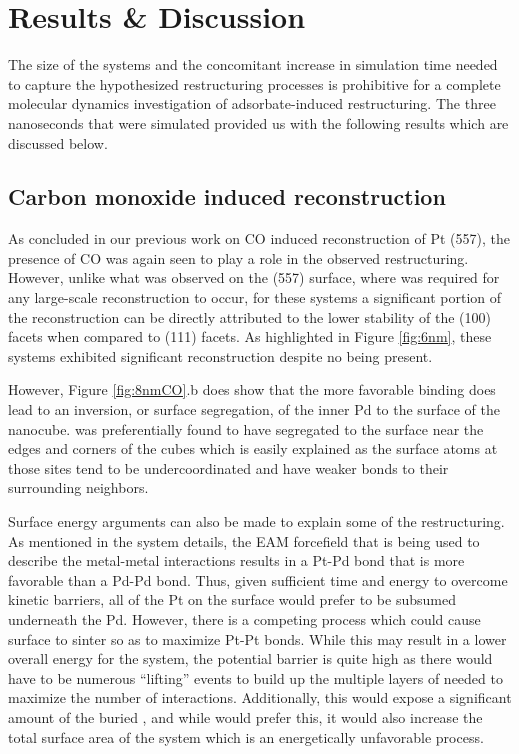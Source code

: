 \section{Results \& Discussion}
The size of the systems and the concomitant increase in simulation time needed
to capture the hypothesized restructuring processes is prohibitive for a
complete molecular dynamics investigation of adsorbate-induced restructuring.
The three nanoseconds that were simulated provided us with the following results
which are discussed below.


\subsection{Carbon monoxide induced reconstruction}
As concluded in our previous work on CO induced reconstruction of Pt (557)\citep{Michalka:2013aa}, the presence of CO
was again seen to play a role in the observed restructuring. However, unlike
what was observed on the  (557) surface, where  was required for
any large-scale reconstruction to occur, for these systems a significant
portion of the reconstruction can be directly attributed to the lower
stability of the (100) facets when compared to (111) facets. As highlighted in
Figure \ref{fig:6nm}, these systems exhibited significant reconstruction
despite no  being present. 

However, Figure \ref{fig:8nmCO}.b does show that the more favorable
 binding does lead to an inversion, or surface segregation, of
the inner Pd to the surface of the nanocube.  was preferentially found
to have segregated to the surface near the edges and corners of the cubes which
is easily explained as the surface atoms at those sites tend to be
undercoordinated and have weaker bonds to their surrounding neighbors.

Surface energy arguments can also be made to explain some of the restructuring.
As mentioned in the system details, the EAM forcefield that is being used to
describe the metal-metal interactions results in a Pt-Pd bond that is more
favorable than a Pd-Pd bond.  Thus, given sufficient time and energy to
overcome kinetic barriers, all of the Pt on the surface would prefer to be
subsumed underneath the Pd. However, there is a competing process which could
cause surface  to sinter so as to maximize Pt-Pt bonds. While this may
result in a lower overall energy for the system, the potential barrier is quite
high as there would have to be numerous ``lifting'' events to build up the
multiple layers of  needed to maximize the number of 
interactions. Additionally, this would expose a significant amount of the
buried , and while  would prefer this, it would also increase
the total surface area of the system which is an energetically unfavorable
process.

